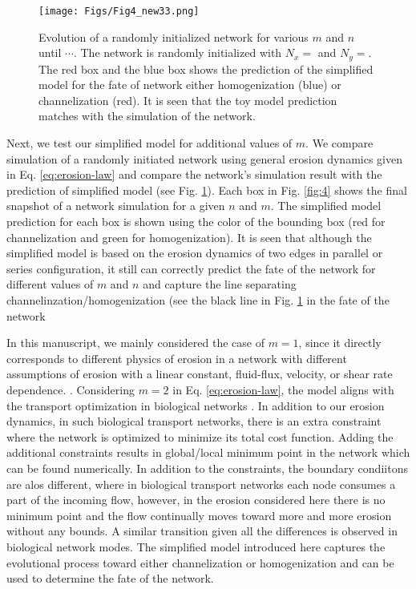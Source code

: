 \documentclass[%
 reprint,
 amsmath,amssymb,
 aps,
]{revtex4-1}
\newcommand{\add}[1]{\noindent \color{blue} #1 \normalcolor}
\begin{document}
\begin{figure}[!h]
    \centering
    \texttt{[image: Figs/Fig4\_new33.png]}
    \caption{Evolution of a randomly initialized network for various $m$ and $n$ until $\cdots$. The network is randomly initialized with $N_x=$ and $N_y=$. The red box and the blue box shows the prediction of the simplified  model for the fate of network either homogenization (blue) or channelization (red). It is seen that the toy model prediction matches with the simulation of the network. }\label{fig:fig4}
\end{figure}



\add{Next, we test our simplified model for additional values of $m$. We compare simulation of a randomly initiated network using general erosion dynamics given in Eq. \eqref{eq:erosion-law} and compare the network's simulation result with the prediction of simplified model (see Fig. \ref{fig:fig4}). Each box in Fig. \ref{fig:4} shows the final snapshot of a network simulation for a given $n$ and $m$. The simplified model prediction for each box is shown using the color of the bounding box (red for channelization and green for homogenization). It is seen that although the simplified model is based on the erosion dynamics of two edges in parallel or series configuration, it still can correctly predict the fate of the network for different values of $m$ and $n$ and capture the line separating channelinzation/homogenization (see the black line in Fig. \ref{fig:fig4} in the fate of the network}
 
 \add{In this manuscript, we mainly considered the case of $m=1$, since it directly corresponds to different physics of erosion in a network with different assumptions of erosion with a linear constant, fluid-flux, velocity, or shear rate dependence. . Considering $m=2$ in Eq. \eqref{eq:erosion-law}, the model aligns with the transport optimization in biological networks \cite{ronellenfitsch2016global,corson2010fluctuations,hu2013adaptation}. In addition to our erosion dynamics, in such biological transport networks, there is an extra constraint where the network is optimized to minimize its total cost function. Adding the additional constraints results in global/local minimum point in the network which can be found numerically. In addition to the constraints, the boundary condiitons are alos different, where in biological transport networks each node consumes a part of the incoming flow, however, in the erosion considered here there is no minimum point and the flow continually moves toward more and more erosion without any bounds. A similar transition given all the differences is observed in biological network modes. The simplified model introduced here captures the evolutional process toward either channelization or homogenization and can be used to determine the fate of the network. }
\end{document}
